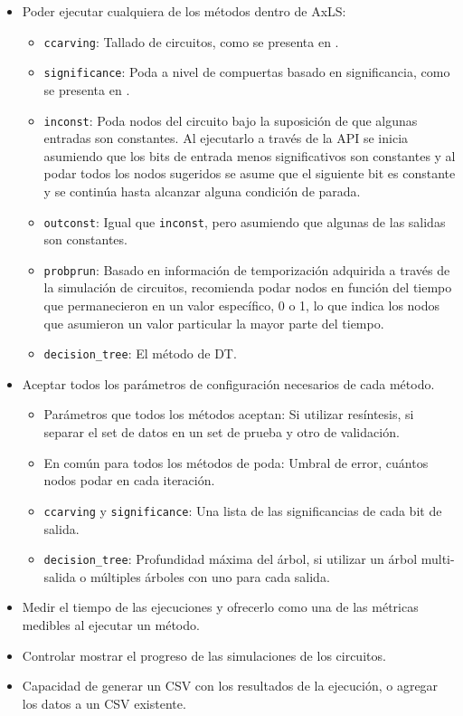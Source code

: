 \begin{itemize}
  \item Poder ejecutar cualquiera de los métodos dentro de AxLS:
    \begin{itemize}
      \item \texttt{ccarving}: Tallado de circuitos, como se presenta en
        \cite{scarabottolo_circuit_2018}.
      \item \texttt{significance}: Poda a nivel de compuertas basado en
        significancia, como se presenta en \cite{schlachter_design_2017}.
      \item \texttt{inconst}: Poda nodos del circuito bajo la suposición de que
        algunas entradas son constantes. Al ejecutarlo a través de la API se
        inicia asumiendo que los bits de entrada menos significativos son
        constantes y al podar todos los nodos sugeridos se asume que el
        siguiente bit es constante y se continúa hasta alcanzar alguna
        condición de parada.
      \item \texttt{outconst}: Igual que \texttt{inconst}, pero asumiendo que
        algunas de las salidas son constantes.
      \item \texttt{probprun}: Basado en información de temporización adquirida
        a través de la simulación de circuitos, recomienda podar nodos en función
        del tiempo que permanecieron en un valor específico, 0 o 1, lo que
        indica los nodos que asumieron un valor particular la mayor parte del
        tiempo.
      \item \texttt{decision\_tree}: El método de DT.
    \end{itemize}
  \item Aceptar todos los parámetros de configuración necesarios de cada
    método.
    \begin{itemize}
      \item Parámetros que todos los métodos aceptan: Si utilizar resíntesis, si
        separar el set de datos en un set de prueba y otro de validación.
      \item En común para todos los métodos de poda: Umbral de error, cuántos
        nodos podar en cada iteración.
      \item \texttt{ccarving} y \texttt{significance}: Una lista de las
        significancias de cada bit de salida.
      \item \texttt{decision\_tree}: Profundidad máxima del árbol, si utilizar un
        árbol multi-salida o múltiples árboles con uno para cada salida.
    \end{itemize}
  \item Medir el tiempo de las ejecuciones y ofrecerlo como una de las métricas
    medibles al ejecutar un método.
  \item Controlar mostrar el progreso de las simulaciones de los circuitos.
  \item Capacidad de generar un CSV con los resultados de la ejecución, o
    agregar los datos a un CSV existente.
\end{itemize}

